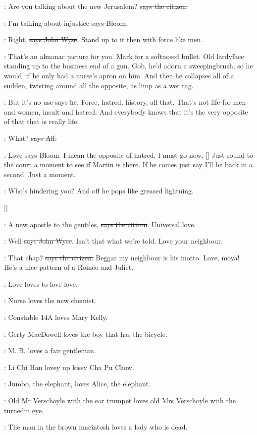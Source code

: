 \citizen:
Are you talking about the new Jerusalem?
\sout{says the citizen.}

\Bloom:
I'm talking about injustice \sout{says Bloom}.

\johnwyse:
Right, \sout{says John Wyse}.
Stand up to it then with force like men.

\Nq:
That's an almanac picture for you. Mark for a softnosed bullet. Old
lardyface standing up to the business end of a gun. Gob, he'd adorn a
sweepingbrush, so he would, if he only had a nurse's apron on him. And
then he collapses all of a sudden, twisting around all the opposite, as
limp as a wet rag.

\Bloom:
But it's no use \sout{says he}.
Force, hatred, history, all that. That's not
life for men and women, insult and hatred. And everybody knows that it's
the very opposite of that that is really life.

\bergan:
What? \sout{says Alf.}

\Bloom:
Love \sout{says Bloom}.
I mean the opposite of hatred. I must go now,
[]
Just round to the court a moment to see if Martin is there.
If he comes just say I'll be back in a second. Just a moment.

\Nq:
Who's hindering you? And off he pops like greased lightning.

[]

\citizen:
A new apostle to the gentiles, \sout{says the citizen}.
Universal love.

\johnwyse:
Well \sout{says John Wyse}.
Isn't that what we're told. Love your neighbour.

\citizen:
That chap? \sout{says the citizen.}
Beggar my neighbour is his motto. Love,
moya! He's a nice pattern of a Romeo and Juliet.

:
Love loves to love love.

:
Nurse loves the new chemist. 

:
Constable 14A loves Mary Kelly. 

:
Gerty MacDowell loves the boy that has the bicycle. 

:
M. B. loves a fair gentleman. 

:
Li Chi Han lovey up kissy Cha Pu Chow. 

:
Jumbo, the elephant, loves Alice, the elephant. 

:
Old Mr Verschoyle with the ear trumpet loves
old Mrs Verschoyle with the turnedin eye. 

:
The man in the brown macintosh loves a lady who is dead. 

